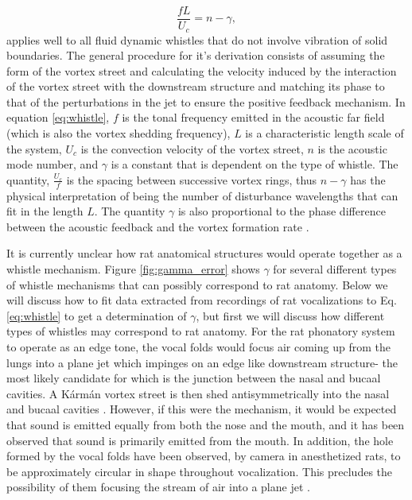 \documentclass[twocolumn, prl]{revtex4}
\begin{document}
\begin{equation}
\label{eq:whistle}
\frac{fL}{U_{c}}=n-\gamma,
\end{equation}
applies well to all fluid dynamic whistles that do not involve vibration of solid boundaries. The general procedure for it's derivation consists of assuming the form of the vortex street and calculating the velocity induced by the interaction of the vortex street with the downstream structure and matching its phase to that of the perturbations in the jet to ensure the positive feedback mechanism. In equation \ref{eq:whistle}, $f$ is the tonal frequency emitted in the acoustic far field (which is also the vortex shedding frequency), $L$ is a characteristic length scale of the system, $U_c$ is the convection velocity of the vortex street, $n$ is the acoustic mode number, and $\gamma$ is a constant that is dependent on the type of whistle. The quantity, $\frac{U_c}{f}$ is the spacing between successive vortex rings, thus $n-\gamma$ has the physical interpretation of being the number of disturbance wavelengths that can fit in the length $L$. The quantity $\gamma$ is also proportional to the phase difference between the acoustic feedback and the vortex formation rate \cite{Howe2008,Blake1986}.

It is currently unclear how rat anatomical structures would operate together as a whistle mechanism. Figure \ref{fig:gamma_error} shows $\gamma$ for several different types of whistle mechanisms that can possibly correspond to rat anatomy. Below we will discuss how to fit data extracted from recordings of rat vocalizations to Eq. \ref{eq:whistle} to get a determination of $\gamma$, but first we will discuss how different types of whistles may correspond to rat anatomy. For the rat phonatory system to operate as an edge tone, the vocal folds would focus air coming up from the lungs into a plane jet which impinges on an edge like downstream structure- the most likely candidate for which is the junction between the nasal and bucaal cavities. A Kármán vortex street is then shed antisymmetrically into the nasal and bucaal cavities \cite{Holger1977,Howe2008}. However, if this were the mechanism, it would be expected that sound is emitted equally from both the nose and the mouth, and it has been observed that sound is primarily emitted from the mouth. In addition, the hole formed by the vocal folds have been observed, by camera in anesthetized rats, to be approximately circular in shape throughout vocalization. This precludes the possibility of them focusing the stream of air into a plane jet \cite{Brudzynski2010}.  
\end{document}

